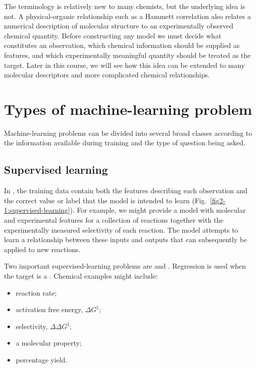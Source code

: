The terminology is relatively new to many chemists, but the underlying idea is not.
A physical-organic relationship such as a Hammett correlation also relates a numerical description of molecular structure to an experimentally observed chemical quantity.
Before constructing any model we must decide what constitutes an observation, which chemical information should be supplied as features, and which experimentally meaningful quantity should be treated as the target.
Later in this course, we will see how this idea can be extended to many molecular descriptors and more complicated chemical relationships.

\section{Types of machine-learning problem}

Machine-learning problems can be divided into several broad classes according to the information available during training and the type of question being asked.

\subsection{Supervised learning}

In , the training data contain both the features describing each observation and the correct value or label that the model is intended to learn (Fig.~\ref{fig2-1:supervised-learning}).
For example, we might provide a model with molecular and experimental features for a collection of reactions together with the experimentally measured selectivity of each reaction.
The model attempts to learn a relationship between these inputs and outputs that can subsequently be applied to new reactions.

Two important supervised-learning problems are  and .
Regression is used when the target is a .
Chemical examples might include:

\begin{itemize}
  \item reaction rate;
  \item activation free energy, \(ΔG^\ddagger\);
  \item selectivity, \(ΔΔG^\ddagger\);
  \item a molecular property;
  \item percentage yield.
\end{itemize}

